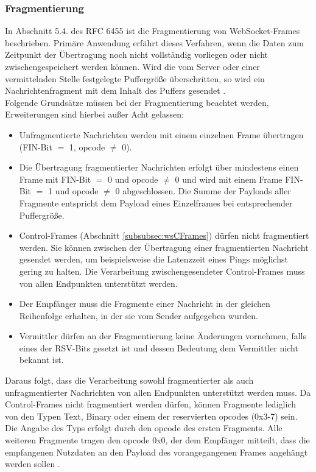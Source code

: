 \documentclass[11pt,a4paper,titlepage]{scrartcl}
\numberwithin{equation}{section}
\begin{document}
\subsubsection*{Fragmentierung}\label{subsubsec:wsFragment}
In Abschnitt 5.4. des RFC 6455 ist die Fragmentierung von WebSocket-Frames beschrieben. Primäre Anwendung erfährt dieses Verfahren, wenn die Daten zum Zeitpunkt der Übertragung noch nicht vollständig vorliegen oder nicht zwischengespeichert werden können. Wird die vom Server oder einer vermittelnden Stelle festgelegte Puffergröße überschritten, so wird ein Nachrichtenfragment mit dem Inhalt des Puffers gesendet \autocite[32]{fette_websocket_2011}.\\

\noindent Folgende Grundsätze müssen bei der Fragmentierung beachtet werden, Erweiterungen sind hierbei außer Acht gelassen:
\begin{itemize}
	\item Unfragmentierte Nachrichten werden mit einem einzelnen Frame übertragen (FIN-Bit $=$ 1,  opcode $\neq$ 0).  
	\item Die Übertragung fragmentierter Nachrichten erfolgt über mindestens einen Frame mit FIN-Bit $=$ 0 und opcode $\neq$ 0 und wird mit einem Frame FIN-Bit $=$ 1 und opcode $\neq$ 0 abgeschlossen. Die Summe der Payloads aller Fragmente entspricht dem Payload eines Einzelframes bei entsprechender Puffergröße.
	\item Control-Frames (Abschnitt \ref{subsubsec:wsCFrames}) dürfen nicht fragmentiert werden. Sie können zwischen der Übertragung einer fragmentierten Nachricht gesendet werden, um beispielsweise die Latenzzeit eines Pings möglichst gering zu halten. Die Verarbeitung zwischengesendeter Control-Frames muss von allen Endpunkten unterstützt werden.
	\item Der Empfänger muss die Fragmente einer Nachricht in der gleichen Reihenfolge erhalten, in der sie vom Sender aufgegeben wurden.
	\item Vermittler dürfen an der Fragmentierung keine Änderungen vornehmen, falls eines der RSV-Bits gesetzt ist und dessen Bedeutung dem Vermittler nicht bekannt ist.
\end{itemize}

\noindent Daraus folgt, dass die Verarbeitung sowohl fragmentierter als auch unfragmentierter Nachrichten von allen Endpunkten unterstützt werden muss. Da Control-Frames nicht fragmentiert werden dürfen, können Fragmente lediglich von den Typen Text, Binary oder einem der reservierten opcodes (0x3-7) sein. Die Angabe des Typs erfolgt durch den opcode des ersten Fragments. Alle weiteren Fragmente tragen den opcode 0x0, der dem Empfänger mitteilt, dass die empfangenen Nutzdaten an den Payload des vorangegangenen Frames angehängt werden sollen \autocite{shepherd_writing_2017}.
\end{document}
